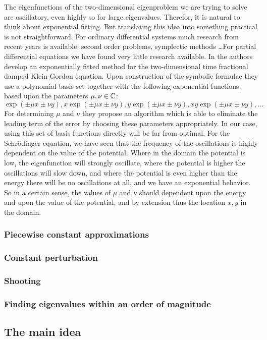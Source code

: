 The eigenfunctions of the two-dimensional eigenproblem we are trying to solve are oscillatory, even highly so for large eigenvalues. Therefor, it is natural to think about exponential fitting. But translating this idea into something practical is not straightforward. For ordinary differential systems much research from recent years is available: second order problems\cite{dambrosio_exponentially_2011,}, symplectic methods \cite{vandenberghe_symplectic_2011,wu_explicit_2012}\dots For partial differential equations we have found very little research available. In \cite{zahra_exponentially_2019} the authors develop an exponentially fitted method for the two-dimensional time fractional damped Klein-Gordon equation. Upon construction of the symbolic formulae they use a polynomial basis set together with the following exponential functions, based upon the parameters $\mu, \nu \in \mathbb{C}$:
$$
\exp(\pm\mu x \pm\nu y), x\exp(\pm\mu x \pm\nu y), y\exp(\pm\mu x \pm\nu y), x y \exp(\pm\mu x \pm\nu y), \dots
$$
For determining $\mu$ and $\nu$ they propose an algorithm which is able to eliminate the leading term of the error by choosing these parameters appropriately. In our case, using this set of basis functions directly will be far from optimal. For the Schrödinger equation, we have seen that the frequency of the oscillations is highly dependent on the value of the potential. Where in the domain the potential is low, the eigenfunction will strongly oscillate, where the potential is higher the oscillations will slow down, and where the potential is even higher than the energy there will be no oscillations at all, and we have an exponential behavior. So in a certain sense, the values of $\mu$ and $\nu$ should dependent upon the energy and upon the value of the potential, and by extension thus the location $x, y$ in the domain.


\subsubsection{Piecewise constant approximations}


\subsubsection{Constant perturbation}


\subsubsection{Shooting}


\subsubsection{Finding eigenvalues within an order of magnitude}


\subsection{The main idea}




\stopchapter
